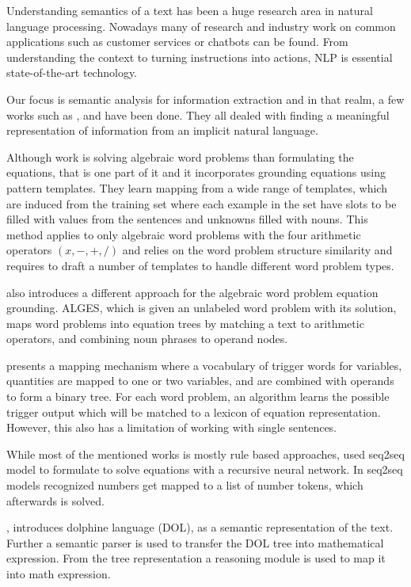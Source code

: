 Understanding semantics of a text has been a huge research area in natural language processing. Nowadays many of research and industry work on common applications such as customer services or chatbots can be found. From understanding the context to turning instructions into actions, NLP is essential state-of-the-art technology.

Our focus is semantic analysis for information extraction and in that realm, a few works such as  \parencite{kushman2014learning}, \parencite{chambers2011template} and \parencite{chen2020mapping} have been done. They all dealed with finding a meaningful representation of information from an implicit natural language.

Although \parencite{kushman2014learning} work is solving algebraic word problems than formulating the equations, that is one part of it and it incorporates grounding equations using pattern templates. They learn mapping from a wide range of templates, which are induced from the training set where each example in the set have slots to be filled with values from the sentences and unknowns filled with nouns. This method applies to only algebraic word problems with the four arithmetic operators $(x,-,+,/)$ and relies on the word problem structure similarity and requires to draft a number of templates to handle different word problem types. 

\parencite{koncel2015parsing}  also introduces a different approach for the algebraic word problem equation grounding. ALGES, which is given an unlabeled word problem with its solution, maps word problems into equation trees by matching a text to arithmetic operators, and combining noun phrases to operand nodes.

\parencite{roy2016equation} presents a mapping mechanism where a vocabulary of trigger words for variables, quantities are mapped to one or two variables, and are combined with operands to form a binary tree. For each word problem, an algorithm learns the possible trigger output which will be matched to a lexicon of equation representation. However, this also has a limitation of working with single sentences. 

While most of the mentioned works is mostly rule based approaches, \parencite{huang-etal-2018-neural} used seq2seq model to formulate to solve equations with a recursive neural network. In seq2seq models recognized numbers get mapped to a list of number tokens, which afterwards is solved.

\parencite{shi2015automatically}, introduces dolphine language (DOL), as a semantic representation of the text. Further a semantic parser is used to transfer the DOL tree into mathematical expression. From the tree representation a reasoning module is used to map it into math expression.  

